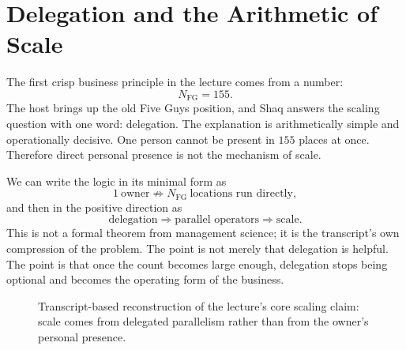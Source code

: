 \section{Delegation and the Arithmetic of Scale}

The first crisp business principle in the lecture comes from a number:
\begin{equation}
N_{\text{FG}} = 155.
\end{equation}
The host brings up the old Five Guys position, and Shaq answers the scaling question with one word: delegation. The explanation is arithmetically simple and operationally decisive. One person cannot be present in \(155\) places at once. Therefore direct personal presence is not the mechanism of scale.

We can write the logic in its minimal form as
\begin{equation}
1\ \text{owner} \not\Rightarrow N_{\text{FG}}\ \text{locations run directly},
\end{equation}
and then in the positive direction as
\begin{equation}
\text{delegation} \Rightarrow \text{parallel operators} \Rightarrow \text{scale}.
\end{equation}
This is not a formal theorem from management science; it is the transcript's own compression of the problem. The point is not merely that delegation is helpful. The point is that once the count becomes large enough, delegation stops being optional and becomes the operating form of the business.

\begin{figure}[h]
\centering
{}
\caption{Transcript-based reconstruction of the lecture's core scaling claim: scale comes from delegated parallelism rather than from the owner's personal presence.}
\end{figure}


